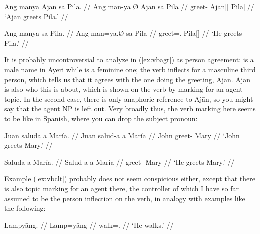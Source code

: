 \pex %
\a\label{ex:vbagr}\begingl
	\gla Ang manya {} Ajān sa Pila. //
	\glb Ang man-ya Ø Ajān sa Pila //
	\glc \AgtT{} greet-\TsgM{} \Top{} ​Ajān[\TsgM{}] \Parg{} Pila[\TsgF{}]//
	\glft `Ajān greets Pila.' //
\endgl

\a\label{ex:vbclt}\begingl
	\gla Ang manya sa Pila. //
	\glb Ang man=ya.Ø sa ​Pila //
	\glc \AgtT{} greet=\TsgM{}.\Top{} \Parg{} ​Pila[\TsgF{}] //
	\glft `He greets Pila.' //
\endgl

\xe

It is probably uncontroversial to analyze  in (\ref{ex:vbagr}) as
person agreement:  is a male name in Ayeri while
 is a feminine one; the verb inflects for a masculine third
person, which tells us that it agrees with the one doing the greeting, Ajān.
Ajān is also who this is about, which is shown on the verb by marking for an
agent topic. In the second case, there is only anaphoric reference to Ajān, so
you might say that the agent NP is left out. Very broadly thus, the verb
marking here seems to be like in Spanish, where you can drop the subject
pronoun:

\pex %
\a\label{ex:vbagrspann}\begingl{}%
	\gla Juan saluda a María. //
	\glb Juan salud-a a María //
	\glc John greet-\Tsg{} \Acc{} Mary //
	\glft `John greets Mary.' //
\endgl

\a\label{ex:vbagrspapr}\begingl
	\gla Saluda a María. //
	\glb Salud-a a María //
	\glc greet-\Tsg{} \Acc{} Mary //
	\glft `He greets Mary.' //
\endgl

\xe

Example (\ref{ex:vbclt}) probably does not seem conspicious either, except that
there is also topic marking for an agent there, the controller of which I have
so far assumed to be the person inflection on the verb, in analogy with
examples like the following:

\ex\label{ex:lampyaang} %
\begingl
	\gla Lampyāng. //
	\glb Lamp=yāng //
	\glc walk=\TsgM{}.\Aarg{} //
	\glft `He walks.' //
\endgl\xe

